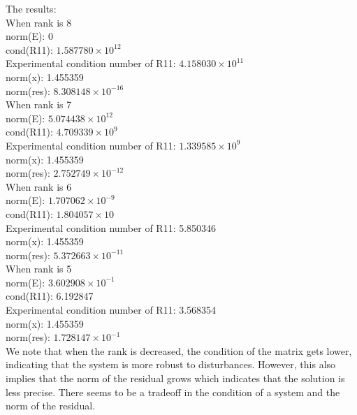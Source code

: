 \documentclass[11pt,a4paper,roman]{scrartcl}
\begin{document}
The results: \\
When rank is 8 \\
\quad	 norm(E): 0 \\
\quad	 cond(R11): $ 1.587780 \times  10^{12}$ \\
\quad	 Experimental condition number of R11: $4.158030 \times  10^{11}$ \\
\quad	 norm(x): 1.455359 \\
\quad	 norm(res):  $8.308148 \times  10^{-16}$ \\
When rank is 7 \\
\quad	 norm(E): $ 5.074438 \times  10^{12}$ \\
\quad	 cond(R11): $4.709339 \times  10^{9}$ \\
\quad	 Experimental condition number of R11: $1.339585 \times  10^{9}$ \\
\quad	 norm(x): 1.455359 \\
\quad	 norm(res): $2.752749 \times  10^{-12}$ \\
When rank is 6 \\
\quad	 norm(E): $1.707062 \times  10^{-9}$ \\
\quad	 cond(R11): $1.804057 \times  10$ \\
\quad	 Experimental condition number of R11: 5.850346 \\
\quad	 norm(x): 1.455359 \\
\quad	 norm(res): $5.372663 \times  10^{-11}$ \\
When rank is 5 \\
\quad	 norm(E): $3.602908 \times  10^{-1}$ \\
\quad	 cond(R11): 6.192847 \\
\quad	 Experimental condition number of R11: 3.568354 \\
\quad	 norm(x): 1.455359 \\
\quad	 norm(res): $ 1.728147 \times  10^{-1}$ \\

We note that when the rank is decreased, the condition of the matrix gets lower, indicating that the system is more robust to disturbances. However, this also implies that the norm of the residual grows which indicates that the solution is less precise. There seems to be a tradeoff in the condition of a system and the norm of the residual. 
\end{document}
